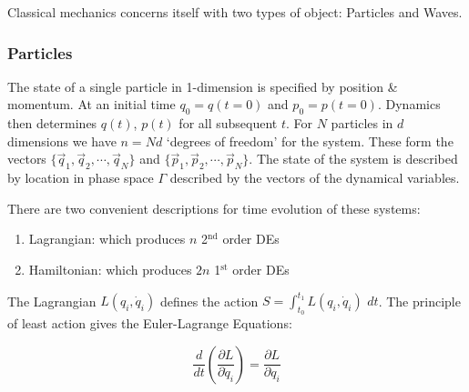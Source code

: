 Classical mechanics concerns itself with two types of object: Particles and Waves.

\subsubsection{Particles}

The state of a single particle in 1-dimension is specified by position \& momentum. At an initial time $q_0 = q(t=0)$ and $p_0 = p(t=0)$. Dynamics then determines $q(t)$, $p(t)$ for all subsequent $t$. For $N$ particles in $d$ dimensions we have $n=Nd$ `degrees of freedom' for the system. These form the vectors $\{ \vec{q}_1, \vec{q}_2, \cdots, \vec{q}_N \}$ and $\{ \vec{p}_1, \vec{p}_2, \cdots, \vec{p}_N \}$. The state of the system is described by location in phase space $\Gamma$ described by the vectors of the dynamical variables. 

There are two convenient descriptions for time evolution of these systems:

\begin{enumerate}

\item Lagrangian: which produces $n$ 2$^\text{nd}$ order DEs

\item Hamiltonian: which produces $2n$ 1$^\text{st}$ order DEs

\end{enumerate}

The Lagrangian $L (q_i, \dot{q}_i)$ defines the action $\displaystyle S = \int_{t_0}^{t_1} L (q_i, \dot{q}_i) \, \, dt$. The principle of least action gives the Euler-Lagrange Equations:

$$\frac{d}{dt} \left ( \frac{\partial L}{\partial \dot{q}_i} \right ) = \frac{\partial L}{\partial q_i}$$